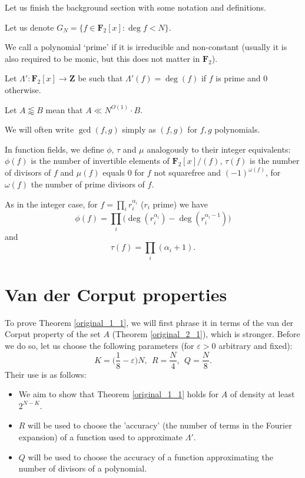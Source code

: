 \documentclass[11pt, reqno]{amsart}
\numberwithin{equation}{section}
\newcommand{\zff}{\mathbf{F}_2[x]}
\newcommand\eps{\varepsilon}
\begin{document}
Let us finish the background section with some notation and definitions.

Let us denote $G_N = \{f \in \mathbf{F}_2[x] : \deg f < N\}$.

We call a polynomial `prime' if it is irreducible and non-constant (usually it is also required to be monic, but this does not matter in $\mathbf{F}_2$).

Let $\Lambda': \zff \rightarrow \mathbf{Z}$ be such that $\Lambda'(f)=\deg (f)$ if $f$ is prime and $0$ otherwise.

Let $A \lessapprox B$ mean that $A \ll N^{O(1)} \cdot B$.

We will often write $\gcd(f, g)$ simply as $(f, g)$ for $f, g$ polynomials.

In function fields, we define $\phi$, $\tau$ and $\mu$ analogously to their integer equivalents: $\phi(f)$ is the number of invertible elements of $\mathbf{F}_2[x] / (f)$, $\tau(f)$ is the number of divisors of $f$ and $\mu(f)$ equals $0$ for $f$ not squarefree and $(-1)^{\omega(f)}$, for $\omega(f)$ the number of prime divisors of $f$.

As in the integer case, for $f=\prod_{i} r_i^{\alpha_i}$ ($r_i$ prime) we have $$\phi(f) = \prod_i\big(\deg(r_i^{\alpha_i}) - \deg(r_i^{\alpha_i - 1})\big)$$ and $$\tau(f) = \prod_{i} (\alpha_i + 1).$$

\section{Van der Corput properties}
\label{section_van_der_corput}

To prove Theorem \ref{original_1_1}, we will first phrase it in terms of the van der Corput property of the set $A$ (Theorem \ref{original_2_1}), which is stronger. Before we do so, let us choose the following parameters (for $\eps>0$ arbitrary and fixed):
\begin{equation}
    K=\big(\frac{1}{8}-\eps\big)N, \ \ R=\frac{N}{4}, \ \ Q=\frac{N}{8}.
\end{equation}
Their use is as follows:
\begin{itemize}
    \item We aim to show that Theorem \ref{original_1_1} holds for $A$ of density at least $2^{N-K}$.
    \item $R$ will be used to choose the 'accuracy' (the number of terms in the Fourier expansion) of a function used to approximate $\Lambda'$.
    \item $Q$ will be used to choose the accuracy of a function approximating the number of divisors of a polynomial.
\end{itemize}
\end{document}
